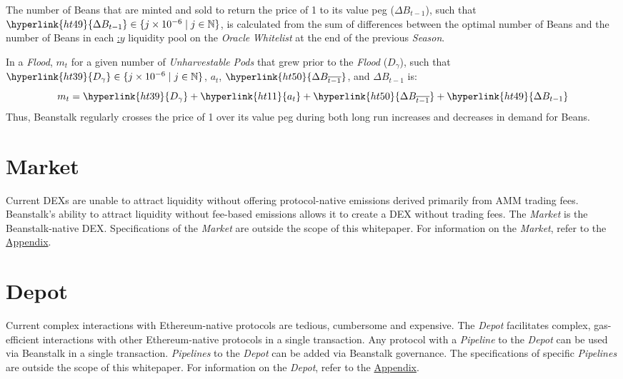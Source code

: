 \documentclass[tikz]{article}
\newcommand{\term}[1]{\textsl{#1}}
\newcommand{\Bean}{} %
\begin{document}
The number of Beans that are minted and sold to return the price of \Bean1 to its value peg (\hyperlink{ht49}{$\Delta B_{t-1}$}), such that $\hyperlink{ht49}{\Delta B_{t-1}} \in \{j \times 10^{-6} \mid j \in \mathbb{N} \}$, is calculated from the sum of differences between the optimal number of Beans and the number of Beans in each \hyperlink{ht6}{\Bean:$y$} liquidity pool on the \term{Oracle} \term{Whitelist} at the end of the previous \term{Season}.

In a \term{Flood}, $m_t$ for a given number of \term{Unharvestable} \term{Pods} that grew prior to the \term{Flood} (\hyperlink{ht39}{$D_{\gamma}$}), such that $\hyperlink{ht39}{D_{\gamma}} \in \{j \times 10^{-6} \mid j \in \mathbb{N} \}$, \hyperlink{ht11}{$a_t$}, $\hyperlink{ht50}{\Delta B_{\overline{t-1}}}$, and \hyperlink{ht49}{$\Delta B_{t-1}$} is:
$$m_t = \hyperlink{ht39}{D_{\gamma}} + \hyperlink{ht11}{a_t} + \hyperlink{ht50}{\Delta B_{\overline{t-1}}} + \hyperlink{ht49}{\Delta B_{t-1}}$$
Thus, Beanstalk regularly crosses the price of \Bean1 over its value peg during both long run increases and decreases in demand for Beans.

\section{Market}
Current DEXs are unable to attract liquidity without offering protocol-native emissions derived primarily from AMM trading fees. Beanstalk's ability to attract liquidity without fee-based emissions allows it to create a DEX without trading fees. The \term{Market} is the Beanstalk-native DEX. Specifications of the \term{Market} are outside the scope of this whitepaper. For information on the \term{Market}, refer to the \hyperlink{section.14}{Appendix}.

\section{Depot}
Current complex interactions with Ethereum-native protocols are tedious, cumbersome and expensive. The \term{Depot} facilitates complex, gas-efficient interactions with other Ethereum-native protocols in a single transaction. Any protocol with a \term{Pipeline} to the \term{Depot} can be used via Beanstalk in a single transaction. \term{Pipelines} to the \term{Depot} can be added via Beanstalk governance. The specifications of specific \term{Pipelines} are outside the scope of this whitepaper. For information on the \term{Depot}, refer to the \hyperlink{section.14}{Appendix}.
\end{document}
